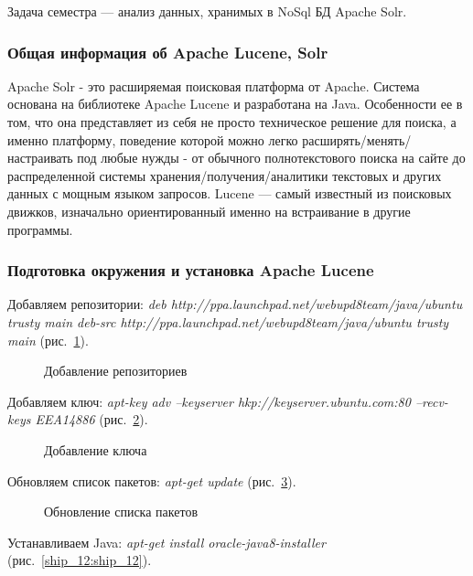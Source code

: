 Задача семестра --- анализ данных, хранимых в NoSql БД Apache Solr.

\subsubsection{Общая информация об Apache Lucene, Solr}

Apache Solr - это расширяемая поисковая платформа от Apache. Система основана на библиотеке Apache Lucene и разработана на Java. Особенности ее в том, что она представляет из себя не просто техническое решение для поиска, а именно платформу, поведение которой можно легко расширять/менять/настраивать под любые нужды - от обычного полнотекстового поиска на сайте до распределенной системы хранения/получения/аналитики текстовых и других данных с мощным языком запросов. Lucene — самый известный из поисковых движков, изначально ориентированный именно на встраивание в другие программы.

\subsubsection{Подготовка окружения и установка Apache Lucene}
Добавляем репозитории:
\textit
{
deb http://ppa.launchpad.net/webupd8team/java/ubuntu trusty main
deb-src http://ppa.launchpad.net/webupd8team/java/ubuntu trusty main
} (рис.~\ref{ship_9:ship_9}).

\begin{figure}[h!]
\caption{Добавление репозиториев}
\label{ship_9:ship_9}
\end{figure}

Добавляем ключ:
  \textit{
apt-key adv --keyserver hkp://keyserver.ubuntu.com:80 --recv-keys EEA14886
} (рис.~\ref{ship_10:ship_10}).

\begin{figure}[h!]
\caption{Добавление ключа}
\label{ship_10:ship_10}
\end{figure}

Обновляем список пакетов:
\textit
{
apt-get update
} (рис.~\ref{ship_11:ship_11}).

\begin{figure}[h!]
\caption{Обновление списка пакетов}
\label{ship_11:ship_11}
\end{figure}

Устанавливаем Java:
\textit
{
apt-get install oracle-java8-installer
} (рис.~\ref{ship_12:ship_12}).

